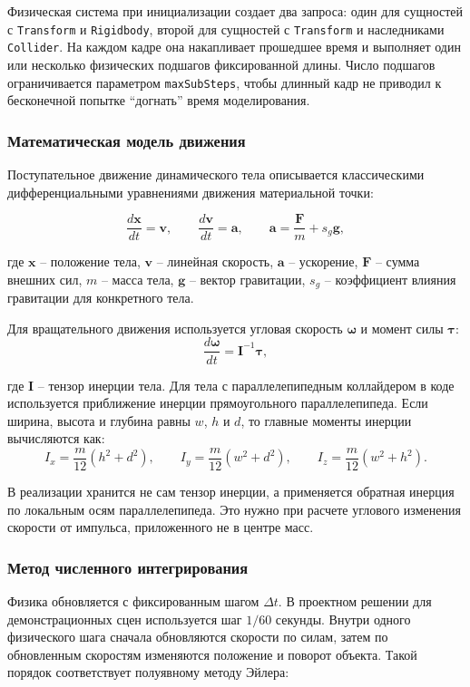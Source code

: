 Физическая система при инициализации создает два запроса: один для сущностей
с \texttt{Transform} и \texttt{Rigidbody}, второй для сущностей с \texttt{Transform}
и наследниками \texttt{Collider}. На каждом кадре она накапливает прошедшее
время и выполняет один или несколько физических подшагов фиксированной длины.
Число подшагов ограничивается параметром \texttt{maxSubSteps}, чтобы длинный
кадр не приводил к бесконечной попытке ``догнать'' время моделирования.

\subsubsection{Математическая модель движения}

Поступательное движение динамического тела описывается классическими
дифференциальными уравнениями движения материальной точки:

\[
\frac{d\mathbf{x}}{dt}=\mathbf{v},\qquad
\frac{d\mathbf{v}}{dt}=\mathbf{a},\qquad
\mathbf{a}=\frac{\mathbf{F}}{m}+s_g\mathbf{g},
\]

где \(\mathbf{x}\) -- положение тела, \(\mathbf{v}\) -- линейная скорость,
\(\mathbf{a}\) -- ускорение, \(\mathbf{F}\) -- сумма внешних сил, \(m\) -- масса
тела, \(\mathbf{g}\) -- вектор гравитации, \(s_g\) -- коэффициент влияния
гравитации для конкретного тела.

Для вращательного движения используется угловая скорость
\(\boldsymbol{\omega}\) и момент силы \(\boldsymbol{\tau}\):
\[
\frac{d\boldsymbol{\omega}}{dt}=\mathbf{I}^{-1}\boldsymbol{\tau},
\]

где \(\mathbf{I}\) -- тензор инерции тела. Для тела с параллелепипедным
коллайдером в коде используется приближение инерции прямоугольного
параллелепипеда. Если ширина, высота и глубина равны \(w\), \(h\) и \(d\), то
главные моменты инерции вычисляются как:
\[
I_x=\frac{m}{12}(h^2+d^2),\qquad
I_y=\frac{m}{12}(w^2+d^2),\qquad
I_z=\frac{m}{12}(w^2+h^2).
\]

В реализации хранится не сам тензор инерции, а применяется обратная инерция
по локальным осям параллелепипеда. Это нужно при расчете углового изменения
скорости от импульса, приложенного не в центре масс.

\subsubsection{Метод численного интегрирования}

Физика обновляется с фиксированным шагом \(\Delta t\). В проектном решении
для демонстрационных сцен используется шаг \(1/60\) секунды. Внутри одного физического шага сначала
обновляются скорости по силам, затем по обновленным скоростям изменяются
положение и поворот объекта. Такой порядок соответствует полуявному методу
Эйлера:

